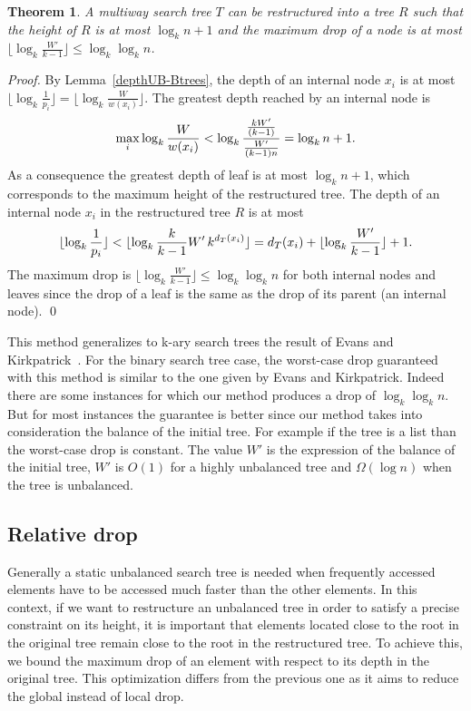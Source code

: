 \documentclass{llncs}\usepackage[english]{babel}
\newtheorem{thm}{Theorem}
\begin{document}
\begin{thm}
\label{dropdepthaddalpha}
A multiway search tree $T$ can be restructured into a tree $R$ such that the height of $R$ is at most $\log_{k} n+1$ and the maximum drop of a node is at most $\lfloor \log_{k} \frac{W'}{k-1}\rfloor\leq \log_{k} \log_{k} n$.
\end{thm}
\begin{proof}
By Lemma~\ref{depthUB-Btrees}, the depth of an internal node $x_i$ is at most $\lfloor \log_{k} \frac{1}{p_i}\rfloor= \lfloor \log_{k} \frac{W}{w(x_i)}\rfloor$. The greatest depth reached by an internal  node is \vspace{-0.2cm} $$\max_i  \log_{k} \frac{W}{w(x_i)}< \log_{k}\frac{\frac{kW'}{(k-1)}}{\frac{W'}{(k-1)n}}= \log_{k} n +1. \vspace{-0.15cm}$$ As a consequence the greatest depth of leaf is at most $ \log_{k} n +1$, which corresponds to the maximum height of the restructured tree.
The depth of an internal node $x_i$ in the restructured tree $R$ is at most $$\lfloor \log_{k} \frac{1}{p_i}\rfloor< \lfloor \log_{k} \frac{k}{k-1}W'\, k^{d_T(x_i)}\rfloor=d_T(x_i)+\lfloor \log_{k} \frac{W'}{k-1}\rfloor+1.\vspace{-0.1cm}$$ The maximum drop is $\lfloor \log_{k} \frac{W'}{k-1}\rfloor \leq \log_{k} \log_{k} n$ for both internal nodes and leaves since the drop of a leaf is the same as the drop of its parent (an internal node). 
\qed \end{proof}

This method generalizes to k-ary search trees the result of Evans and Kirkpatrick~\cite{restructuringordered}. For the binary search tree case, the worst-case drop guaranteed with this method is similar to the one given by Evans and Kirkpatrick. Indeed there are some instances for which our method produces a drop of $\log_k \log_k n$. But for most instances the guarantee is better since our method takes into consideration the balance of the initial tree. For example if the tree is a list than the worst-case drop is constant. The value $W'$ is the expression of the balance of the initial tree, $W'$ is $O(1)$ for a highly unbalanced tree and $\Omega(\log n)$ when the tree is unbalanced. 



\subsection{Relative drop}
\label{depthpropdrop}
Generally a static unbalanced search tree is needed when frequently accessed elements have to be accessed much faster than the other elements. In this context, if we want to restructure an unbalanced tree in order to satisfy a precise constraint on its height, it is important that elements  located close to the root in the original tree remain close to the root in the restructured tree. To achieve this, we bound the maximum drop of an element with respect to its depth in the original tree. This optimization differs from the previous one as it aims to reduce the global instead of local drop. 
\end{document}

